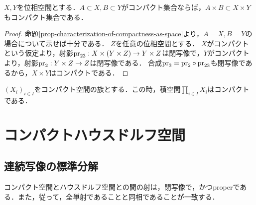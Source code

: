 \documentclass[uplatex,dvipdfmx]{jsreport}
\begin{document}
\begin{corollary}[積もコンパクト]\label{cor-product-of-compact-sets-is-compact}
    $X,Y$を位相空間とする．$A\subset X,B\subset Y$がコンパクト集合ならば，$A\times B\subset X\times Y$もコンパクト集合である．
\end{corollary}
\begin{proof}
    命題\ref{prop-characterization-of-compactness-as-space}より，$A=X,B=Y$の場合について示せば十分である．
    $Z$を任意の位相空間とする．
    $X$がコンパクトという仮定より，射影$\mathrm{pr}_{23}:X\times(Y\times Z)\to Y\times Z$は閉写像で，$Y$がコンパクトより，射影$\mathrm{pr}_2:Y\times Z\to Z$は閉写像である．
    合成$\mathrm{pr}_3=\mathrm{pr}_2\circ\mathrm{pr}_{23}$も閉写像であるから，$X\times Y$はコンパクトである．
\end{proof}

\begin{theorem}[Tychonoff (AC)]\label{thm-Tychonoff}
    $(X_i)_{i\in I}$をコンパクト空間の族とする．この時，積空間$\prod_{i\in I}X_i$はコンパクトである．
\end{theorem}

\section{コンパクトハウスドルフ空間}

\subsection{連続写像の標準分解}

\begin{tcolorbox}[colframe=ForestGreen, colback=ForestGreen!10!white, breakable ,colbacktitle=ForestGreen!40!white, coltitle=black,fonttitle=\bfseries\sffamily
    ,title=コンパクト空間とハウスドルフ空間との間のHom集合]
    コンパクト空間とハウスドルフ空間との間の射は，閉写像で，かつproperである．また，従って，全単射であることと同相であることが一致する．
\end{tcolorbox}
\end{document}
